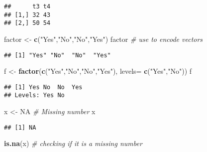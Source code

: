 \documentclass[
]{article}
\newenvironment{Shaded}{\begin{snugshade}}{\end{snugshade}}
\newcommand{\AttributeTok}[1]{\textcolor[rgb]{0.13,0.29,0.53}{#1}}
\newcommand{\CommentTok}[1]{\textcolor[rgb]{0.56,0.35,0.01}{\textit{#1}}}
\newcommand{\ConstantTok}[1]{\textcolor[rgb]{0.56,0.35,0.01}{#1}}
\newcommand{\FunctionTok}[1]{\textcolor[rgb]{0.13,0.29,0.53}{\textbf{#1}}}
\newcommand{\NormalTok}[1]{#1}
\newcommand{\OtherTok}[1]{\textcolor[rgb]{0.56,0.35,0.01}{#1}}
\newcommand{\StringTok}[1]{\textcolor[rgb]{0.31,0.60,0.02}{#1}}
\begin{document}
\begin{verbatim}
##      t3 t4
## [1,] 32 43
## [2,] 50 54
\end{verbatim}

\begin{Shaded}
\begin{Highlighting}[]
\NormalTok{factor }\OtherTok{\textless{}{-}} \FunctionTok{c}\NormalTok{(}\StringTok{"Yes"}\NormalTok{,}\StringTok{"No"}\NormalTok{,}\StringTok{"No"}\NormalTok{,}\StringTok{"Yes"}\NormalTok{)}
\NormalTok{factor }\CommentTok{\# use to encode vectors}
\end{Highlighting}
\end{Shaded}

\begin{verbatim}
## [1] "Yes" "No"  "No"  "Yes"
\end{verbatim}

\begin{Shaded}
\begin{Highlighting}[]
\NormalTok{f }\OtherTok{\textless{}{-}} \FunctionTok{factor}\NormalTok{(}\FunctionTok{c}\NormalTok{(}\StringTok{"Yes"}\NormalTok{,}\StringTok{"No"}\NormalTok{,}\StringTok{"No"}\NormalTok{,}\StringTok{"Yes"}\NormalTok{), }\AttributeTok{levels=} \FunctionTok{c}\NormalTok{(}\StringTok{"Yes"}\NormalTok{,}\StringTok{"No"}\NormalTok{))}
\NormalTok{f}
\end{Highlighting}
\end{Shaded}

\begin{verbatim}
## [1] Yes No  No  Yes
## Levels: Yes No
\end{verbatim}

\begin{Shaded}
\begin{Highlighting}[]
\NormalTok{x }\OtherTok{\textless{}{-}} \ConstantTok{NA} \CommentTok{\# Missing number}
\NormalTok{x}
\end{Highlighting}
\end{Shaded}

\begin{verbatim}
## [1] NA
\end{verbatim}

\begin{Shaded}
\begin{Highlighting}[]
\FunctionTok{is.na}\NormalTok{(x) }\CommentTok{\# checking if it is a missing number }
\end{Highlighting}
\end{Shaded}
\end{document}
